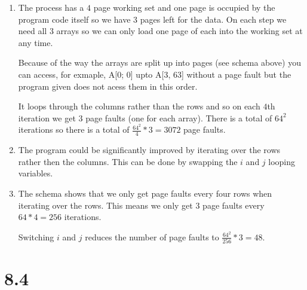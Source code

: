 \documentclass[12pt]{article}
\begin{document}
\begin{enumerate}[a]
	\item %
	The process has a $4$ page working set and one page is occupied by the program code itself so we have $3$ pages left for the data. On each step we need all $3$ arrays so we can only load one page of each into the working set at any time.

	Because of the way the arrays are split up into pages (see schema above) you can access, for exmaple, A[0; 0] upto A[3, 63] without a page fault but the program given does not acess them in this order.

	It loops through the columns rather than the rows and so on each $4$th iteration we get $3$ page faults (one for each array). There is a total of $64^2$ iterations so there is a total of $\frac{64^2}{4} * 3 = 3072$ page faults.

	\item %
	The program could be significantly improved by iterating over the rows rather then the columns. This can be done by swapping the $i$ and $j$ looping variables.

	\item %
	The schema shows that we only get page faults every four rows when iterating over the rows. This means we only get $3$ page faults every $64 * 4 = 256$ iterations.

	Switching $i$ and $j$ reduces the number of page faults to $\frac{64^2}{256} * 3 = 48$.
\end{enumerate}

\section*{8.4}
\end{document}
